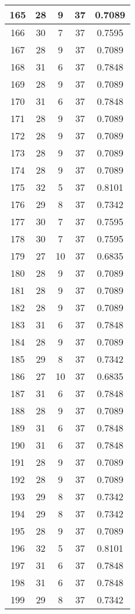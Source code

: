\documentclass[letterpaper, 12pt]{article}
\begin{document}
\begin{longtable}{|c|c|c|c|c|}
\hline
165 & 28 & 9 & 37 & 0.7089 \\
\hline
166 & 30 & 7 & 37 & 0.7595 \\
\hline
167 & 28 & 9 & 37 & 0.7089 \\
\hline
168 & 31 & 6 & 37 & 0.7848 \\
\hline
169 & 28 & 9 & 37 & 0.7089 \\
\hline
170 & 31 & 6 & 37 & 0.7848 \\
\hline
171 & 28 & 9 & 37 & 0.7089 \\
\hline
172 & 28 & 9 & 37 & 0.7089 \\
\hline
173 & 28 & 9 & 37 & 0.7089 \\
\hline
174 & 28 & 9 & 37 & 0.7089 \\
\hline
175 & 32 & 5 & 37 & 0.8101 \\
\hline
176 & 29 & 8 & 37 & 0.7342 \\
\hline
177 & 30 & 7 & 37 & 0.7595 \\
\hline
178 & 30 & 7 & 37 & 0.7595 \\
\hline
179 & 27 & 10 & 37 & 0.6835 \\
\hline
180 & 28 & 9 & 37 & 0.7089 \\
\hline
181 & 28 & 9 & 37 & 0.7089 \\
\hline
182 & 28 & 9 & 37 & 0.7089 \\
\hline
183 & 31 & 6 & 37 & 0.7848 \\
\hline
184 & 28 & 9 & 37 & 0.7089 \\
\hline
185 & 29 & 8 & 37 & 0.7342 \\
\hline
186 & 27 & 10 & 37 & 0.6835 \\
\hline
187 & 31 & 6 & 37 & 0.7848 \\
\hline
188 & 28 & 9 & 37 & 0.7089 \\
\hline
189 & 31 & 6 & 37 & 0.7848 \\
\hline
190 & 31 & 6 & 37 & 0.7848 \\
\hline
191 & 28 & 9 & 37 & 0.7089 \\
\hline
192 & 28 & 9 & 37 & 0.7089 \\
\hline
193 & 29 & 8 & 37 & 0.7342 \\
\hline
194 & 29 & 8 & 37 & 0.7342 \\
\hline
195 & 28 & 9 & 37 & 0.7089 \\
\hline
196 & 32 & 5 & 37 & 0.8101 \\
\hline
197 & 31 & 6 & 37 & 0.7848 \\
\hline
198 & 31 & 6 & 37 & 0.7848 \\
\hline
199 & 29 & 8 & 37 & 0.7342 \\
\hline
\end{longtable}
\end{document}
